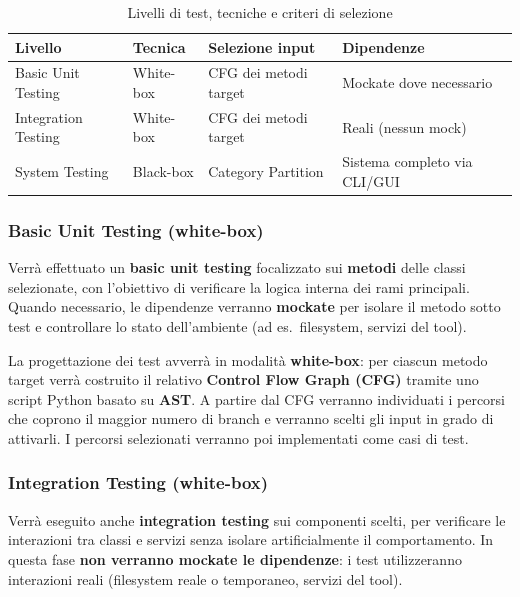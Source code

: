 \documentclass[11pt,a4paper]{article}
\newcommand{\thead}[1]{\textbf{#1}}
\begin{document}
\begin{table}[H]
  \centering\small
  \caption{Livelli di test, tecniche e criteri di selezione}
  \label{tab:mtp-strategia}
  \begin{tabularx}{\linewidth}{@{}L{3.2cm} L{2.3cm} L{3.0cm} Y@{}}
    \toprule
    \thead{Livello} & \thead{Tecnica} & \thead{Selezione input} &
    \thead{Dipendenze}\\
    \midrule
    Basic Unit Testing   & White-box & CFG dei metodi target &
      Mockate dove necessario\\
    Integration Testing  & White-box & CFG dei metodi target &
      Reali (nessun mock)\\
    System Testing       & Black-box & Category Partition &
      Sistema completo via CLI/GUI\\
    \bottomrule
  \end{tabularx}
\end{table}

\subsubsection{Basic Unit Testing (white-box)}
\label{sec:mtp-unit}

Verr\`a effettuato un \textbf{basic unit testing} focalizzato sui \textbf{metodi}
delle classi selezionate, con l'obiettivo di verificare la logica interna dei
rami principali. Quando necessario, le dipendenze verranno \textbf{mockate} per
isolare il metodo sotto test e controllare lo stato dell'ambiente (ad es.\
filesystem, servizi del tool).

La progettazione dei test avverr\`a in modalit\`a \textbf{white-box}: per
ciascun metodo target verr\`a costruito il relativo \textbf{Control Flow Graph
(CFG)} tramite uno script Python basato su \textbf{AST}. A partire dal CFG
verranno individuati i percorsi che coprono il maggior numero di branch e
verranno scelti gli input in grado di attivarli. I percorsi selezionati verranno
poi implementati come casi di test.

\subsubsection{Integration Testing (white-box)}
\label{sec:mtp-integration}

Verr\`a eseguito anche \textbf{integration testing} sui componenti scelti, per
verificare le interazioni tra classi e servizi senza isolare artificialmente il
comportamento. In questa fase \textbf{non verranno mockate le dipendenze}: i
test utilizzeranno interazioni reali (filesystem reale o temporaneo, servizi del
tool).
\end{document}
